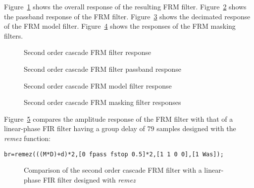 \documentclass[a4paper,twoside,10pt,english]{report}
\begin{document}
Figure~\ref{fig:2nd-order-cascade-frequency-response-masking-filter-response} 
shows the overall response of the resulting FRM filter. 
Figure~\ref{fig:2nd-order-cascade-frequency-response-masking-filter-passband} 
shows the passband response of the FRM filter. 
Figure~\ref{fig:2nd-order-cascade-frequency-response-masking-filter-model} 
shows the decimated response of the FRM model filter. 
Figure~\ref{fig:2nd-order-cascade-frequency-response-masking-filter-masking} 
shows the responses of the FRM masking filters.
\begin{figure}[!htbp]
\begin{center}
\scalebox{0.7}{}
\caption{Second order cascade FRM filter response}
\label{fig:2nd-order-cascade-frequency-response-masking-filter-response}
\end{center}
\end{figure}
\begin{figure}[!htbp]
\begin{center}
\scalebox{0.7}{}
\caption{Second order cascade FRM filter passband response}
\label{fig:2nd-order-cascade-frequency-response-masking-filter-passband}
\end{center}
\end{figure}
\begin{figure}[!htbp]
\begin{center}
\scalebox{0.7}{}
\caption{Second order cascade FRM model filter response}
\label{fig:2nd-order-cascade-frequency-response-masking-filter-model}
\end{center}
\end{figure}
\begin{figure}[!htbp]
\begin{center}
\scalebox{0.7}{}
\caption{Second order cascade FRM masking filter responses}
\label{fig:2nd-order-cascade-frequency-response-masking-filter-masking}
\end{center}
\end{figure}
Figure~\ref{fig:2nd-order-cascade-frequency-response-remez-comparison} compares
the amplitude response of the FRM filter with that of a linear-phase FIR 
filter having a group delay of $79$ samples designed with the \emph{remez} 
function:
\begin{small}
\begin{verbatim}
br=remez(((M*D)+d)*2,[0 fpass fstop 0.5]*2,[1 1 0 0],[1 Was]);
\end{verbatim}
\end{small}
\begin{figure}[!htbp]
\begin{center}
\scalebox{0.7}{}
\caption{Comparison of the second order cascade FRM filter with a linear-phase FIR filter designed with \emph{remez}}
\label{fig:2nd-order-cascade-frequency-response-remez-comparison}
\end{center}
\end{figure}
\clearpage
\end{document}
